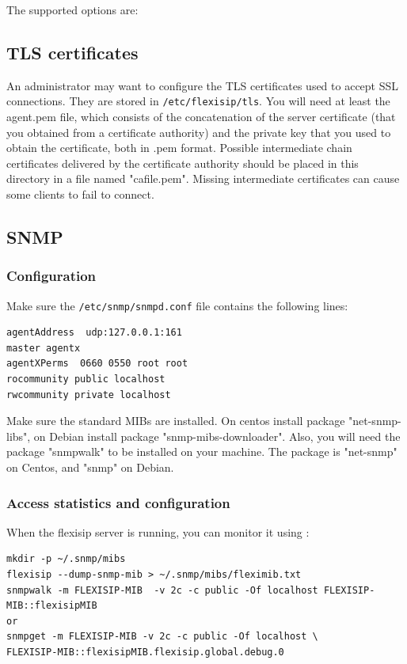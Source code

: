 \documentclass[a4paper,10pt]{article}
\begin{document}
The supported options are:





\subsection{TLS certificates}
An administrator may want to configure the TLS certificates used to accept SSL connections.
They are stored in \verb|/etc/flexisip/tls|. You will need at least the agent.pem file, which consists of the concatenation of the server certificate
(that you obtained from a certificate authority) and the private key that you used to obtain the certificate, both in .pem format. Possible intermediate chain certificates delivered by the certificate authority should be placed in this directory in a file named "cafile.pem". Missing intermediate certificates can cause some clients to fail to connect.

\subsection{SNMP}
\subsubsection{Configuration}
Make sure the \verb|/etc/snmp/snmpd.conf| file contains the following lines:
\begin{verbatim}
agentAddress  udp:127.0.0.1:161
master agentx
agentXPerms  0660 0550 root root
rocommunity public localhost
rwcommunity private localhost
\end{verbatim}

Make sure the standard MIBs are installed.
On centos install package "net-snmp-libs", on Debian install package "snmp-mibs-downloader".
Also, you will need the package "snmpwalk" to be installed on your machine. The package is "net-snmp" on Centos, and "snmp" on Debian.



\subsubsection{Access statistics and configuration}
When the flexisip server is running, you can monitor it using :
\begin{verbatim}
mkdir -p ~/.snmp/mibs
flexisip --dump-snmp-mib > ~/.snmp/mibs/fleximib.txt
snmpwalk -m FLEXISIP-MIB  -v 2c -c public -Of localhost FLEXISIP-MIB::flexisipMIB
or
snmpget -m FLEXISIP-MIB -v 2c -c public -Of localhost \
FLEXISIP-MIB::flexisipMIB.flexisip.global.debug.0
\end{verbatim}
\end{document}
